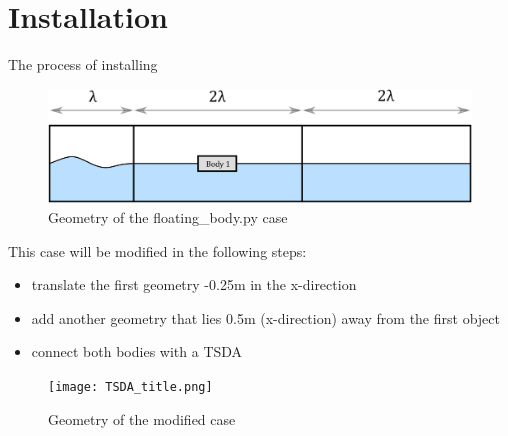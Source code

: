 \documentclass{report}
\begin{document}
\section{Installation}
The process of installing
\begin{figure}[h]
  \centering
  \includegraphics[width=15cm]{floating_body.png}
  \setcaptionwidth{13cm}
  \caption{Geometry of the floating\_body.py case}
  \label{floating_body}
\end{figure}
\newline
This case will be modified in the following steps:
\begin{itemize}
\item translate the first geometry -0.25m in the x-direction
\item add another geometry that lies 0.5m (x-direction) away from the first object
\item connect both bodies with a TSDA
\end{itemize}
\begin{figure}[h]
  \centering
  \texttt{[image: TSDA\_title.png]}
  \setcaptionwidth{15cm}
  \caption{Geometry of the modified case}
  \label{TSDA_connected_bodies}
\end{figure}
\newpage
\end{document}
